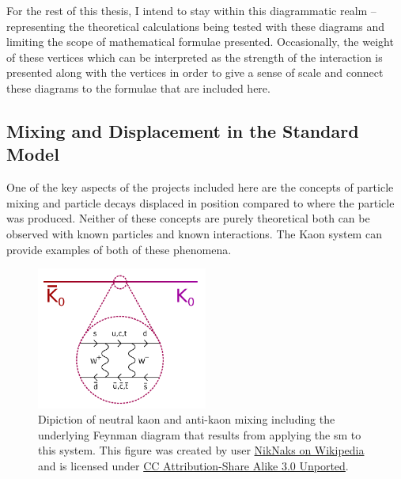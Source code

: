 For the rest of this thesis, I intend to stay within this diagrammatic realm -- representing the theoretical
calculations being tested with these diagrams and limiting the scope of mathematical formulae
presented. Occasionally, the weight of these vertices which can be interpreted as the strength
of the interaction is presented along with the vertices in order to give a sense of scale
and connect these diagrams to the formulae that are included here.

\subsection{Mixing and Displacement in the Standard Model}
One of the key aspects of the projects included here are the concepts of particle mixing
and particle decays displaced in position compared to where the particle was produced.
Neither of these concepts are purely theoretical both can be observed with known
particles and known interactions. The Kaon system can provide examples of both of these
phenomena.

\begin{figure}
    \centering
    \includegraphics[width=0.5\textwidth]{figures/intro/Kaon-box-diagram-with-bar.pdf}
    \caption{
        Dipiction of neutral kaon and anti-kaon mixing including the underlying
        Feynman diagram that results from applying the \ac{sm} to this system.
        This figure was created by user
        \href{https://commons.wikimedia.org/wiki/File:Kaon-box-diagram-with-bar.svg}{NikNaks on Wikipedia}
        and is licensed under
        \href{https://creativecommons.org/licenses/by-sa/3.0/deed.en}{CC Attribution-Share Alike 3.0 Unported}.
    }
    \label{fig:kaon-box-diagram}
\end{figure}

